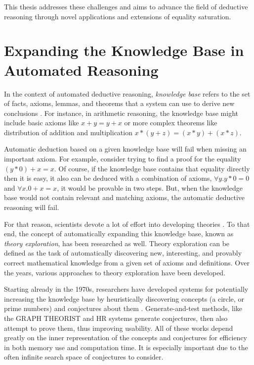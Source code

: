 This thesis addresses these challenges and aims to advance the field of deductive reasoning through novel applications and extensions of equality saturation. 


\section{Expanding the Knowledge Base in Automated Reasoning}

In the context of automated deductive reasoning, \emph{knowledge base} refers to the set of facts, axioms, lemmas, and theorems that a system can use to derive new conclusions \cite{amlenat1977automated, thesy}.
For instance, in arithmetic reasoning, the knowledge base might include basic axioms like $x + y = y + x$ or more complex theorems like distribution of addition and multiplication $x * (y + z) = (x * y) + (x * z)$.

Automatic deduction based on a given knowledge base will fail when missing an important axiom.
For example, consider trying to find a proof for the equality $(y * 0) + x = x$.
Of course, if the knowledge base contains that equality directly then it is easy, it also can be deduced with a combination of axioms, $\forall y. y * 0 = 0$ and $\forall x. 0 + x = x$, it would be provable in two steps.
But, when the knowledge base would not contain relevant and matching axioms, the automatic deductive reasoning will fail.

For that reason, scientists devote a lot of effort into developing theories \cite{qedatlarge}.
To that end, the concept of automatically expanding this knowledge base, known as \emph{theory exploration}, has been researched as well.
Theory exploration can be defined as the task of automatically discovering new, interesting, and provably correct mathematical knowledge from a given set of axioms and definitions.
Over the years, various approaches to theory exploration have been developed.

Starting already in the 1970s, researchers have developed systems for potentially increasing the knowledge base by heuristically discovering concepts (\eg a circle, or prime numbers) and conjectures about them \cite{amlenat1977automated,buchanan1981dendral}.
Generate-and-test methods, like the GRAPH THEORIST and HR systems \cite{epstein1988graphtheist,colton1999automatichr} generate conjectures, then also attempt to prove them, thus improving usability.
All of these works depend greatly on the inner representation of the concepts and conjectures for efficiency in both memory use and computation time.
It is especially important due to the often infinite search space of conjectures to consider.

